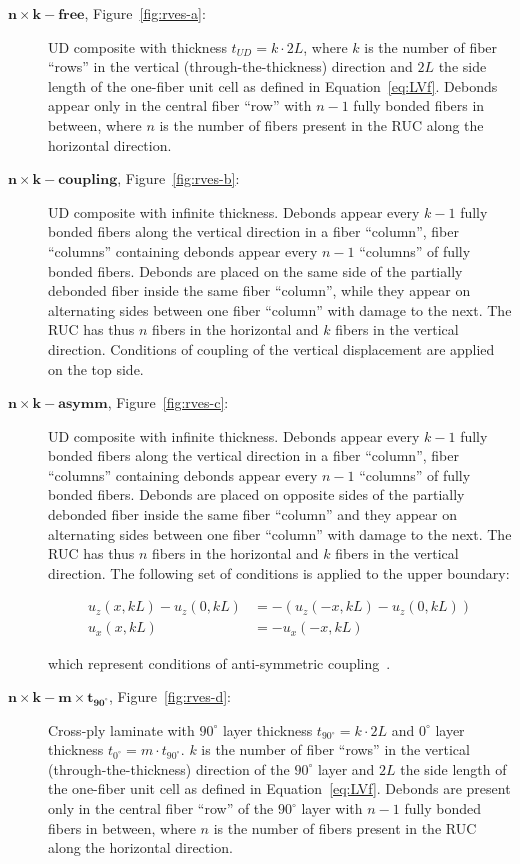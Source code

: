 \documentclass[12pt,a4paper]{article}
\begin{document}
\begin{description}
\item [$\mathbf{n\times k-free}$, Figure~\ref{fig:rves-a}: ]UD composite with thickness $t_{UD}=k\cdot2L$, where $k$ is the number of fiber ``rows'' in the vertical (through-the-thickness) direction and $2L$ the side length of the one-fiber unit cell as defined in Equation~\ref{eq:LVf}. Debonds appear only in the central fiber ``row'' with $n-1$ fully bonded fibers in between, where $n$ is the number of fibers present in the RUC along the horizontal direction.
\item [$\mathbf{n\times k-coupling}$, Figure~\ref{fig:rves-b}: ]UD composite with infinite thickness. Debonds appear every $k-1$ fully bonded fibers along the vertical direction in a fiber ``column'', fiber ``columns'' containing debonds appear every $n-1$ ``columns'' of fully bonded fibers. Debonds are placed on the same side of the partially debonded fiber inside the same fiber ``column'', while they appear on alternating sides between one fiber ``column'' with damage to the next. The RUC has thus $n$ fibers in the horizontal and $k$ fibers in the vertical direction. Conditions of coupling of the vertical displacement are applied on the top side.
\item [$\mathbf{n\times k-asymm}$, Figure~\ref{fig:rves-c}: ]UD composite with infinite thickness. Debonds appear every $k-1$ fully bonded fibers along the vertical direction in a fiber ``column'', fiber ``columns'' containing debonds appear every $n-1$ ``columns'' of fully bonded fibers. Debonds are placed on opposite sides of the partially debonded fiber inside the same fiber ``column'' and they appear on alternating sides between one fiber ``column'' with damage to the next. The RUC has thus $n$ fibers in the horizontal and $k$ fibers in the vertical direction. The following set of conditions is applied to the upper boundary:

\begin{equation}\label{eq:asymm}
\begin{aligned}
u_{z}\left(x,kL\right)-u_{z}\left(0,kL\right)&=-\left(u_{z}\left(-x,kL\right)-u_{z}\left(0,kL\right)\right)\\
u_{x}\left(x,kL\right)&=-u_{x}\left(-x,kL\right)
\end{aligned}
\end{equation}

which represent conditions of anti-symmetric coupling~\cite{DiStasio2019b}.

\item [$\mathbf{n\times k-m\times t_{90^{\circ}}}$, Figure~\ref{fig:rves-d}: ]Cross-ply laminate with $90^{\circ}$ layer thickness $t_{90^{\circ}}=k\cdot2L$ and $0^{\circ}$ layer thickness $t_{0^{\circ}}=m\cdot t_{90^{\circ}}$. $k$ is the number of fiber ``rows'' in the vertical (through-the-thickness) direction of the $90^{\circ}$ layer and $2L$ the side length of the one-fiber unit cell as defined in Equation~\ref{eq:LVf}. Debonds are present only in the central fiber ``row'' of the $90^{\circ}$ layer with $n-1$ fully bonded fibers in between, where $n$ is the number of fibers present in the RUC along the horizontal direction.
\end{description}
\end{document}
